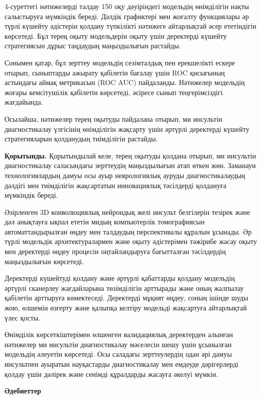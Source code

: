 \begin{multicols}{2}
4-суреттегі нәтижелерді талдау 150 оқу дәуіріндегі модельдің өнімділігін
нақты салыстыруға мүмкіндік береді. Дәлдік графиктері мен жоғалту
функциялары әр түрлі күшейту әдістерін қолдану түпкілікті нәтижеге
айтарлықтай әсер ететіндігін көрсетеді. Бұл терең оқыту модельдерін
оқыту үшін деректерді күшейту стратегиясын дұрыс таңдаудың маңыздылығын
растайды.

Сонымен қатар, бұл зерттеу модельдің сезімталдық пен ерекшелікті ескере
отырып, сыныптарды ажырату қабілетін бағалау үшін ROC қисығының
астындағы аймақ метрикасын (ROC AUC) пайдаланды. Нәтижелер модельдің
жоғары кемсітушілік қабілетін көрсетеді, әсіресе сынып теңгерімсіздігі
жағдайында.

Осылайша, нәтижелер терең оқытуды пайдалана отырып, ми инсультін
диагностикалау үлгісінің өнімділігін жақсарту үшін әртүрлі деректерді
күшейту стратегияларын қолданудың тиімділігін растайды.

{\bfseries Қорытынды.} Қорытындылай келе, терең оқытуды қолдана отырып, ми
инсультін диагностикалау саласындағы зерттеудің маңыздылығын атап өткен
жөн. Заманауи технологиялардың дамуы осы ауыр неврологиялық ауруды
диагностикалаудың дәлдігі мен тиімділігін жақсартатын инновациялық
тәсілдерді қолдануға мүмкіндік береді.

Әзірленген 3D конволюциялық нейрондық желі инсульт белгілерін тезірек
және дәл анықтауға ықпал ететін мидың компьютерлік томографиясын
автоматтандырылған өңдеу мен талдаудың перспективалы құралын ұсынады. Әр
түрлі модельдік архитектуралармен және оқыту әдістерімен тәжірибе жасау
оқыту мен деректерді өңдеу процесін оңтайландыруға бағытталған
тәсілдердің маңыздылығын көрсетеді.

Деректерді күшейтуді қолдану және әртүрлі қабаттарды қолдану модельдің
әртүрлі сканерлеу жағдайларына төзімділігін арттырады және оның жалпылау
қабілетін арттыруға көмектеседі. Деректерді мұқият өңдеу, соның ішінде
шуды жою, өлшемін өзгерту және қалыпқа келтіру модельді жақсартуға
айтарлықтай үлес қосты.

Өнімділік көрсеткіштерімен өлшенген валидациялық деректерден алынған
нәтижелер ми инсультін диагностикалау мәселесін шешу үшін ұсынылған
модельдің әлеуетін көрсетеді. Осы саладағы зерттеулердің одан әрі дамуы
инсультпен ауыратын науқастарды диагностикалау мен емдеуде дәрігерлерді
қолдау үшін дәлірек және сенімді құралдарды жасауға әкелуі мүмкін.
\end{multicols}

\begin{center}
{\bfseries Әдебиеттер}
\end{center}

